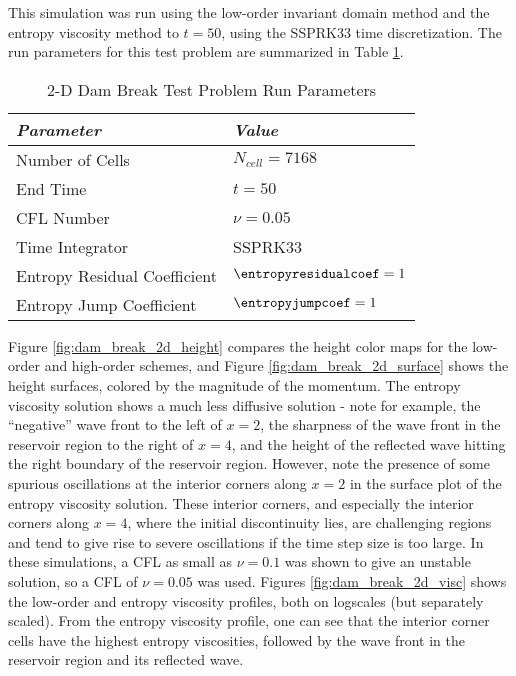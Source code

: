 This simulation was run using the low-order invariant domain method and
the entropy viscosity method to $t=50$, using the SSPRK33 time discretization.
The run parameters for this test problem are summarized in Table
\ref{tab:dam_break_2d_run}.

\begin{table}[htb]\caption{2-D Dam Break Test Problem Run Parameters}
\label{tab:dam_break_2d_run}
\centering
\begin{tabular}{l l}\toprule
\emph{Parameter} & \emph{Value}\\\midrule
Number of Cells & $N_{cell} = 7168$\\
End Time        & $t=50$\\
CFL Number      & $\nu=0.05$\\
Time Integrator & SSPRK33\\\midrule
Entropy Residual Coefficient & $\entropyresidualcoef=1$\\
Entropy Jump Coefficient & $\entropyjumpcoef=1$\\
\bottomrule\end{tabular}
\end{table}

Figure \ref{fig:dam_break_2d_height} compares the height color maps for
the low-order and high-order schemes, and Figure \ref{fig:dam_break_2d_surface} 
shows the height surfaces, colored by the magnitude of the momentum.
The entropy viscosity solution shows a much less diffusive solution - note
for example, the ``negative'' wave front to the left of $x=2$, the sharpness
of the wave front in the reservoir region to the right of $x=4$, and the height
of the reflected wave hitting the right boundary of the reservoir region.
However, note the presence of some spurious oscillations at the interior corners
along $x=2$ in the surface plot of the entropy viscosity solution. These
interior corners, and especially the interior corners along $x=4$, where
the initial discontinuity lies, are challenging regions and tend to give rise to
severe oscillations if the time step size is too large. In these simulations,
a CFL as small as $\nu=0.1$ was shown to give an unstable solution, so a
CFL of $\nu=0.05$ was used. Figures \ref{fig:dam_break_2d_visc} shows
the low-order and entropy viscosity profiles, both on logscales (but separately
scaled). From the entropy viscosity profile, one can see that the interior
corner cells have the highest entropy viscosities, followed by the wave
front in the reservoir region and its reflected wave.

